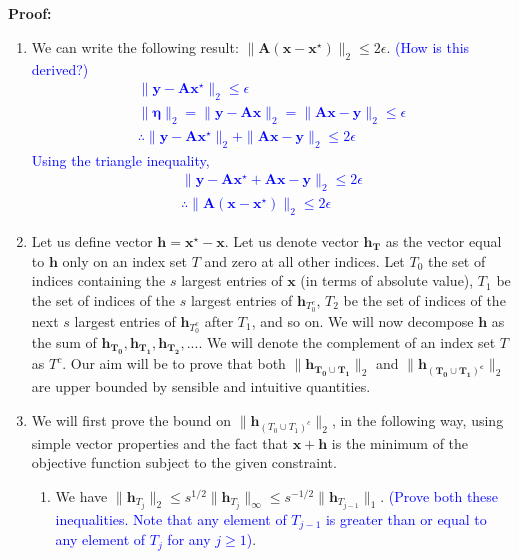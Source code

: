 \documentclass[11pt]{article}
\begin{document}
\begin{enumerate}
\\
\\
\textbf{Proof:}
\\
\begin{enumerate}
\item We can write the following result: $\|\mathbf{A(x-x^{\star})}\|_2 \leq 2\epsilon$. \textcolor{blue}{(How is this derived?)}
\textcolor{blue}{
\begin{gather*}
\|\mathbf{y} - \mathbf{Ax^{\star}}\|_2 \leq \epsilon \\
\|\mathbf{\eta}\|_2 = \|\mathbf{y} - \mathbf{Ax}\|_2 = \|\mathbf{Ax} - \mathbf{y}\|_2  \leq \epsilon \\
\therefore \|\mathbf{y} - \mathbf{Ax^{\star}}\|_2 + \|\mathbf{Ax} - \mathbf{y}\|_2 \leq 2\epsilon
\end{gather*}
Using the triangle inequality,
\begin{align*}
\| \mathbf{y} - \mathbf{Ax^{\star}} + \mathbf{Ax} - \mathbf{y} \|_2 \leq 2\epsilon \\
\therefore \|\mathbf{A(x-x^{\star})}\|_2 \leq 2\epsilon
\end{align*}
}
\item Let us define vector $\mathbf{h} = \mathbf{x^{\star}-x}$. Let us denote vector $\mathbf{h_T}$ as the vector equal to $\mathbf{h}$ only on an index set $T$ and zero at all other indices. Let $T_0$ the set of indices containing the $s$ largest entries of $\mathbf{x}$ (in terms of absolute value), $T_1$ be the set of indices of the $s$ largest entries of $\mathbf{h}_{T^c_0}$, $T_2$ be the set of indices of the next $s$ largest entries of $\mathbf{h}_{T^c_0}$ after $T_1$, and so on. We will now decompose $\mathbf{h}$ as the sum of $\mathbf{h_{T_0}}, \mathbf{h_{T_1}}, \mathbf{h_{T_2}}, ...$. We will denote the complement of an index set $T$ as $T^c$. Our aim will be to prove that both $\|\mathbf{h_{T_0 \cup T_1}}\|_2$ and $\|\mathbf{h_{(T_0 \cup T_1)^c}}\|_2$ are upper bounded by sensible and intuitive quantities. 
\item We will first prove the bound on $\|\mathbf{h}_{(T_0 \cup T_1)^c}\|_2$, in the following way, using simple vector properties and the fact that $\mathbf{x+h}$ is the minimum of the objective function subject to the given constraint. 
\begin{enumerate}
\item We have $\|\mathbf{h}_{T_j}\|_2 \leq s^{1/2} \|\mathbf{h}_{T_j}\|_\infty \leq s^{-1/2} \|\mathbf{h}_{T_{j-1}}\|_1$. \textcolor{blue}{(Prove both these inequalities. Note that any element of $T_{j-1}$ is greater than or equal to any element of $T_j$ for any $j \geq 1$)}.\\

\end{enumerate}
\end{enumerate}
\end{enumerate}
\end{document}
